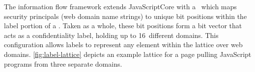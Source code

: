 The information flow framework extends JavaScriptCore with a \FlowLabelRegistry\ which maps security principals (web domain name strings) to unique bit positions within the label portion of a \jsvalue.
Taken as a whole, these bit positions form a bit vector that acts as a confidentiality label, holding up to 16~different domains.
This configuration allows labels to represent any element within the lattice over web domains.
\autoref{fig:label-lattice} depicts an example lattice for a page pulling JavaScript programs from three separate domains.




